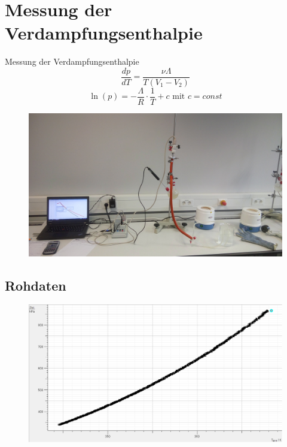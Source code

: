 \documentclass[11pt]{beamer}
\begin{document}
\section{Messung der Verdampfungsenthalpie}
\begin{frame}{Messung der Verdampfungsenthalpie}
\begin{equation*}
\frac{dp}{dT}=\frac{\nu \Lambda}{T(V_1-V_2)}
\end{equation*}
\begin{equation*}
\ln(p)=-\frac{\Lambda}{R}\cdot \frac{1}{T}+c \text{ mit } c=const
\end{equation*}
\end{frame}

\begin{frame}
\begin{figure}[H]
\centering
\includegraphics[scale=0.065]{Bilder/IMG_20160331_121650.jpg}
\end{figure}
\end{frame}

\subsection{Rohdaten}
\begin{frame}
\begin{figure}[H]
\centering
\includegraphics[scale=0.4]{Bilder/RohdatenHaupmessungGrp11.png}
\end{figure}
\end{frame}
\end{document}
